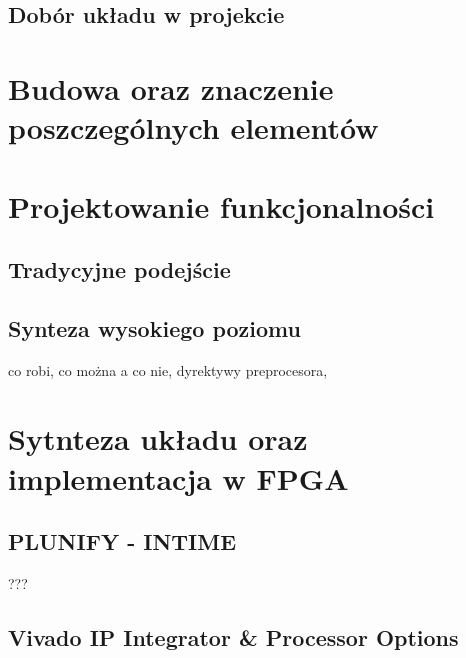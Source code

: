 \subsection{Dobór układu w projekcie}

\section{Budowa oraz znaczenie poszczególnych elementów}

\section{Projektowanie funkcjonalności}
\subsection{Tradycyjne podejście}
\subsection{Synteza wysokiego poziomu}
co robi, co można a co nie, dyrektywy preprocesora,

\section{Sytnteza układu oraz implementacja w FPGA}
\subsection{PLUNIFY - INTIME}
???
\subsection{Vivado IP Integrator \& Processor Options}

